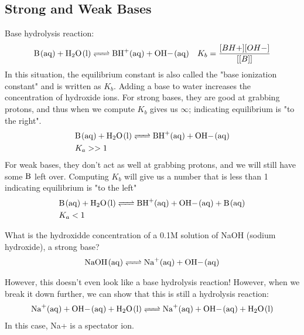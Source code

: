 \documentclass[../CHEM152Notes.tex]{subfiles}
\begin{document}
\subsection*{Strong and Weak Bases}
Base hydrolysis reaction:
\begin{equation*}
    \begin{aligned}
        \ce{B_(aq) + H2O_(l) <=> BH+_(aq) + OH-_(aq)} \quad K_b = \frac{[BH+][OH-]}{[[B]]}
    \end{aligned}
\end{equation*}
In this situation, the equilibrium constant is also called the "base ionization constant" and is written as $K_b$.
\newline
Adding a base to water increases the concentration of hydroxide ions.
\newline
For strong bases, they are good at grabbing protons, and thus when we compute $K_b$ gives us $\infty$; indicating equilibrium is "to the right".
\begin{equation*}
    \begin{aligned}
        &\ce{B_(aq) + H2O_(l) <=> BH+_(aq) + OH-_(aq)} \\
        &K_a >> 1
    \end{aligned}
\end{equation*}
For weak bases, they don't act as well at grabbing protons, and we will still have some $\ce{B}$ left over. Computing $K_b$ will give us a number that is less than 1 indicating equilibrium is "to the left"
\begin{equation*}
    \begin{aligned}
        &\ce{B_(aq) + H2O_(l) <=> BH+_(aq) + OH-_(aq) + B_(aq)} \\
        &K_a < 1
    \end{aligned}
\end{equation*}

\begin{exmp}
    What is the hydroxidde concentration of a 0.1M solution of NaOH (sodium hydroxide), a strong base?
    \begin{equation*}
        \begin{aligned}
            \ce{NaOH_(aq) <=> Na+_(aq) + OH-_(aq)}
        \end{aligned}
    \end{equation*}    
\end{exmp}
However, this doesn't even look like a base hydrolysis reaction! However, when we break it down further, we can show that this is still a hydrolysis reaction:
\begin{equation*}
    \begin{aligned}
        \ce{Na+_(aq) + OH-_(aq) + H2O_(l) <=> Na+_(aq) + OH-_(aq) + H2O_(l)}
    \end{aligned}
\end{equation*}
In this case, Na+ is a spectator ion.
\end{document}
